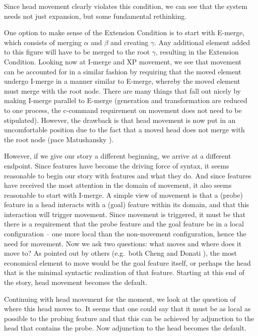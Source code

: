 \documentclass[output=paper,colorlinks,citecolor=brown,
]{langscibook}
\begin{document}
Since head movement clearly violates this condition, we can see that the system needs not just expansion, but some fundamental rethinking.  

One option to make sense of the Extension Condition is to start with E-merge, which consists of merging $\alpha$ and $\beta$ and creating $\gamma$. Any additional element added to this figure will have to be merged to the root $\gamma$, resulting in the Extension Condition. Looking now at I-merge and XP movement, we see that movement can be accounted for in a similar fashion by requiring that the moved element undergo I-merge in a manner similar to E-merge, whereby the moved element must merge with the root node.  There are many things that fall out nicely by making I-merge parallel to E-merge (generation and transformation are reduced to one process, the c-command requirement on movement does not need to be stipulated).  However, the drawback is that head movement is now put in an uncomfortable position due to the fact that a moved head does not merge with the root node (pace Matushansky \citeyear{Matushansky:2006}).

However, if we give our story a different beginning, we arrive at a different endpoint. Since features have become the driving force of syntax, it seems reasonable to begin our story with features and what they do.  And since  features have received the most attention in the domain of movement, it also seems reasonable to start with I-merge.  A simple view of movement is that a (probe) feature in a head interacts with a (goal) feature within its domain, and that this interaction  will trigger movement.  Since movement is triggered, it must be that there is a requirement that the probe feature and the goal feature be in a local configuration -- one more local than the non-movement configuration, hence the need for movement.  Now we ask two questions: what moves and where does it move to?  As pointed out by others (e.g.\ both Cheng \citeyear{Cheng:2000b} and Donati \citeyear{Donati:2006}), the most economical element to move would be the goal feature itself, or perhaps the head that is the minimal syntactic realization of that feature. Starting at this end of the story, head movement becomes the default.   

Continuing with head movement for the moment, we  look at the question of where this head moves to.  It seems that one could say that it must be as local as possible to the probing feature and that this can be achieved by adjunction to the head that contains the probe.  Now adjunction to the head becomes the default.  
\end{document}
